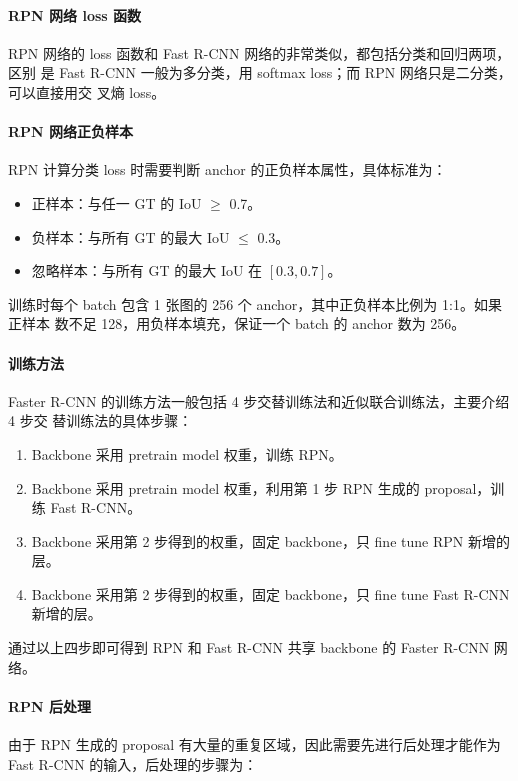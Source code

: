 \paragraph{RPN 网络 loss 函数} 
RPN 网络的 loss 函数和 Fast R-CNN 网络的非常类似，都包括分类和回归两项，区别
是 Fast R-CNN 一般为多分类，用 softmax loss；而 RPN 网络只是二分类，可以直接用交
叉熵 loss。

\paragraph{RPN 网络正负样本} 
RPN 计算分类 loss 时需要判断 anchor 的正负样本属性，具体标准为：

\begin{itemize}
  \item 正样本：与任一 GT 的 IoU $\geq$ 0.7。
  \item 负样本：与所有 GT 的最大 IoU $ \leq $ 0.3。
  \item 忽略样本：与所有 GT 的最大 IoU 在 $[0.3, 0.7]$。
\end{itemize}

训练时每个 batch 包含 1 张图的 256 个 anchor，其中正负样本比例为 1:1。如果正样本
数不足 128，用负样本填充，保证一个 batch 的 anchor 数为 256。

\paragraph{训练方法}

Faster R-CNN 的训练方法一般包括 4 步交替训练法和近似联合训练法，主要介绍 4 步交
替训练法的具体步骤：

\begin{enumerate}
  \item Backbone 采用 pretrain model 权重，训练 RPN。
  \item Backbone 采用 pretrain model 权重，利用第 1 步 RPN 生成的 proposal，训练 Fast R-CNN。
  \item Backbone 采用第 2 步得到的权重，固定 backbone，只 fine tune RPN 新增的层。
  \item Backbone 采用第 2 步得到的权重，固定 backbone，只 fine tune Fast R-CNN 新增的层。
\end{enumerate}

通过以上四步即可得到 RPN 和 Fast R-CNN 共享 backbone 的 Faster R-CNN 网络。

\paragraph{RPN 后处理}
由于 RPN 生成的 proposal 有大量的重复区域，因此需要先进行后处理才能作为 Fast
R-CNN 的输入，后处理的步骤为：

